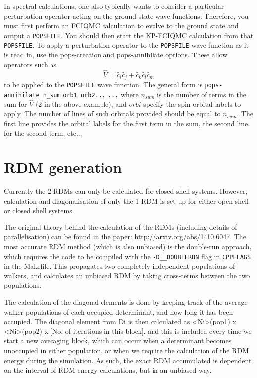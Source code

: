 \documentclass[a4paper,notitlepage]{scrreprt}
\let\code\lstinline
\begin{document}
    In spectral calculations, one also typically wants to consider a particular
    perturbation operator acting on the ground state wave functions. Therefore,
    you must first perform an FCIQMC calculation to evolve to the ground state
    and output a \code{POPSFILE}. You should then start the KP-FCIQMC
    calculation from that \code{POPSFILE}. To apply a perturbation operator to
    the \code{POPSFILE} wave function as it is read in, use the pops-creation
    and pops-annihilate options. These allow operators such as
    \begin{equation}
        \hat{V} = \hat{c}_i \hat{c}_j + \hat{c}_k \hat{c}_l \hat{c}_m
    \end{equation}
    to be applied to the \code{POPSFILE} wave function. The general form is
    \code{pops-annihilate n_sum}
    \code{orb1 orb2...}
    \code{...}
    where $n_{sum}$ is the number of terms in the sum for $\hat{V}$ (2 in the
    above example), and $orbi$ specify the spin orbital labels to apply. The
    number of lines of such orbitals provided should be equal to $n_{sum}$. The
    first line provides the orbital labels for the first term in the sum, the
    second line for the second term, etc...
    
\section{RDM generation}

Currently the 2-RDMs can only be calculated for closed shell systems.  However, calculation and
diagonalisation of only the 1-RDM is set up for either open shell or closed shell systems.

The original theory behind the calculation of the RDMs (including details of parallelisation) can be found in the paper:
\url{http://arxiv.org/abs/1410.6047}. The most accurate RDM method (which is also unbiased) is the double-run approach, which requires
the code to be compiled with the \code{-D__DOUBLERUN} flag in \code{CPPFLAGS} in the Makefile. This propagates
two completely independent populations of walkers, and calculates an unbiased RDM by taking cross-terms
between the two populations.

The calculation of the diagonal elements is done by keeping track of the average walker populations of each
occupied determinant, and how long it has been occupied.  The diagonal element from Di is then calculated
as <Ni>(pop1) x <Ni>(pop2) x [No. of iterations in this block], and this is included every time we start a new
averaging block, which can occur when a determinant becomes unoccupied in either population, or when we require
the calculation of the RDM energy during the simulation. As such, the exact RDM accumulated is dependent on
the interval of RDM energy calculations, but in an unbiased way.
\end{document}
